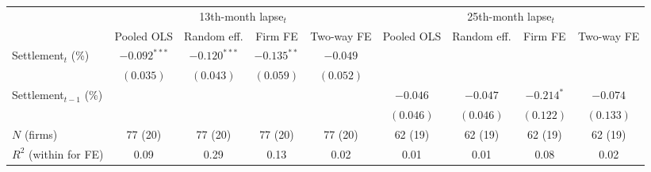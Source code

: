 \begin{tabular}{lcccccccc}
\toprule
 & \multicolumn{4}{c}{13th-month lapse$_t$} & \multicolumn{4}{c}{25th-month lapse$_t$} \\ \cmidrule(lr){2-5}\cmidrule(lr){6-9}
 & Pooled OLS & Random eff. & Firm FE & Two-way FE & Pooled OLS & Random eff. & Firm FE & Two-way FE \\
\midrule
Settlement$_t$ (\%) & $-0.092^{***}$ & $-0.120^{***}$ & $-0.135^{**}$ & $-0.049$ &  &  &  &  \\
 & $(0.035)$ & $(0.043)$ & $(0.059)$ & $(0.052)$ &  &  &  &  \\
Settlement$_{t-1}$ (\%) &  &  &  &  & $-0.046$ & $-0.047$ & $-0.214^{*}$ & $-0.074$ \\
 &  &  &  &  & $(0.046)$ & $(0.046)$ & $(0.122)$ & $(0.133)$ \\
\midrule
$N$ (firms) & 77 (20) & 77 (20) & 77 (20) & 77 (20) & 62 (19) & 62 (19) & 62 (19) & 62 (19) \\
$R^2$ (within for FE) & 0.09 & 0.29 & 0.13 & 0.02 & 0.01 & 0.01 & 0.08 & 0.02 \\
\bottomrule
\end{tabular}